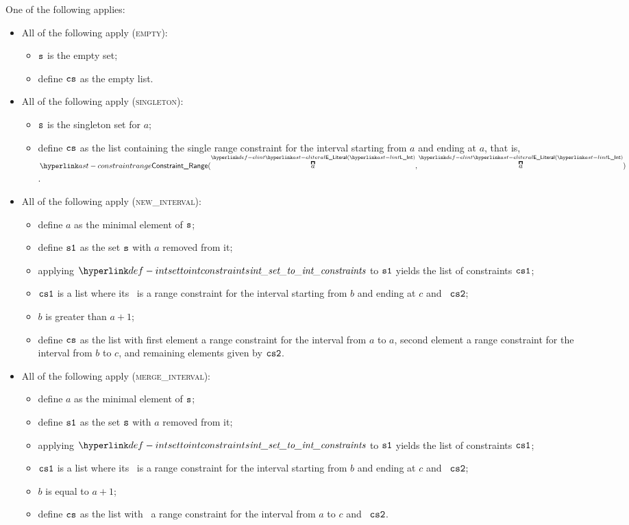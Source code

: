 \ProseParagraph
One of the following applies:
\begin{itemize}
  \item All of the following apply (\textsc{empty}):
  \begin{itemize}
    \item $\texttt{s}$ is the empty set;
    \item define $\texttt{cs}$ as the empty list.
  \end{itemize}

  \item All of the following apply (\textsc{singleton}):
  \begin{itemize}
    \item $\texttt{s}$ is the singleton set for $a$;
    \item define $\texttt{cs}$ as the list containing the single range constraint for the interval starting from $a$
          and ending at $a$, that is, $\ConstraintRange(\ELInt{a}, \ELInt{a})$.
  \end{itemize}

  \item All of the following apply (\textsc{new\_interval}):
  \begin{itemize}
    \item define $a$ as the minimal element of $\texttt{s}$;
    \item define $\texttt{s1}$ as the set $\texttt{s}$ with $a$ removed from it;
    \item applying $\intsettointconstraints$ to $\texttt{s1}$ yields the list of constraints $\texttt{cs1}$;
    \item $\texttt{cs1}$ is a list where its \head\ is a range constraint for the interval starting from $b$ and ending at $c$
          and \tail\ $\texttt{cs2}$;
    \item $b$ is greater than $a+1$;
    \item define $\texttt{cs}$ as the list with first element a range constraint for the interval from $a$ to $a$,
          second element a range constraint for the interval from $b$ to $c$, and remaining elements given by $\texttt{cs2}$.
  \end{itemize}

  \item All of the following apply (\textsc{merge\_interval}):
  \begin{itemize}
    \item define $a$ as the minimal element of $\texttt{s}$;
    \item define $\texttt{s1}$ as the set $\texttt{s}$ with $a$ removed from it;
    \item applying $\intsettointconstraints$ to $\texttt{s1}$ yields the list of constraints $\texttt{cs1}$;
    \item $\texttt{cs1}$ is a list where its \head\ is a range constraint for the interval starting from $b$ and ending at $c$
          and \tail\ $\texttt{cs2}$;
    \item $b$ is equal to $a+1$;
    \item define $\texttt{cs}$ as the list with \head\  a range constraint for the interval from $a$ to $c$
          and \tail\ $\texttt{cs2}$.
  \end{itemize}
\end{itemize}

